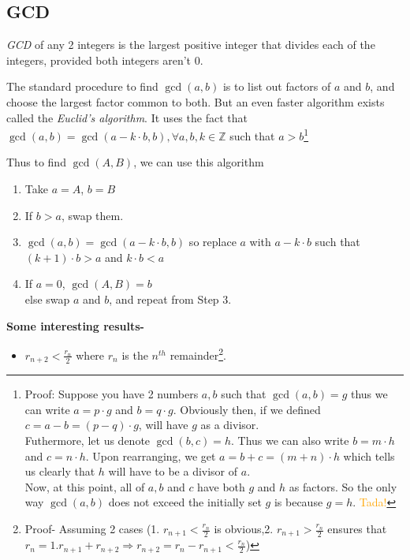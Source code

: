 	 \begin{mdframed}
	 	\subsection{GCD}\label{subsec:gcd}
	 		\begin{definition}\label{def:Euclid}
	 			\emph{GCD} of any 2 integers is the largest positive integer that divides each of the integers, provided both integers aren't 0.
	 		\end{definition}
	 		The standard procedure to find \(\gcd(a,b)\) is to list out factors of \(a\) and \(b\), and choose the largest factor common to both. But an even faster algorithm exists called the \emph{Euclid's algorithm}. It uses the fact that \(\gcd(a,b)=\gcd(a-k \cdot b, b), \forall a,b,k \in \mathbb{Z}\) such that \( a>b\)\footnote{Proof: Suppose you have 2 numbers \(a, b\) such that \(\gcd (a,b) = g\) thus we can write \(a = p \cdot g\) and \(b = q \cdot g\). Obviously then, if we defined \(c = a-b= (p-q) \cdot g\), will have \(g\) as a divisor. \\ Futhermore, let us denote \(\gcd(b,c)=h\). Thus we can also write \(b = m \cdot h\) and \(c = n \cdot h\). Upon rearranging, we get \(a=b+c=(m+n)\cdot h\) which tells us clearly that \(h\) will have to be a divisor of \(a\).\\ Now, at this point, all of \(a, b\) and \(c\) have both \(g\) and \(h\) as factors. So the only way \(\gcd(a,b)\) does not exceed the initially set \(g\) is because \(g = h\). \textcolor{orange}{Tada!}} \par
	 		Thus to find \(\gcd(A,B)\), we can use this algorithm
	 		\begin{enumerate}
	 			\item Take $a=A$, $b=B$
	 			\item If $b>a$, swap them.
	 			\item \(\gcd(a, b)=\gcd(a-k \cdot b, b)\) so replace \(a\) with \(a-k \cdot b\) such that \((k+1) \cdot b > a\) and \(k \cdot b < a\)
	 			\item If \(a=0\), \(\gcd(A,B)=b\) \\ else swap $a$ and $b$, and repeat from Step 3. 
	 		\end{enumerate}
	 		\textbf{Some interesting results-}
	 		\begin{itemize}
	 			\item \(r_{n+2}<\frac{r_n}{2}\) where \(r_n\) is the $n^{th}$ remainder\footnote{Proof- Assuming 2 cases (1. \(r_{n+1}<\frac{r_n}{2}\) is obvious,2. \(r_{n+1}>\frac{r_n}{2}\) ensures that \(r_n=1.r_{n+1}+r_{n+2} \Rightarrow r_{n+2}=r_n-r_{n+1}<\frac{r_n}{2}\))}.

\end{itemize}
\end{mdframed}
